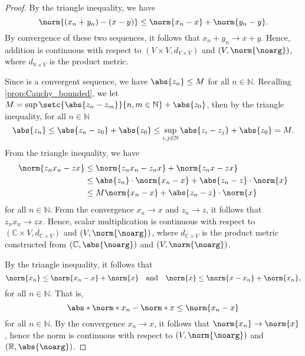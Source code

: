 \begin{proof}
    By the triangle inequality, we have
    \begin{equation*}
        \norm{(x_n + y_n) - (x - y)} \leq \norm{x_n - x} + \norm{y_n - y}.
    \end{equation*}
    By convergence of these two sequences, it follows that \(x_n + y_n \to x + y\). Hence, addition is continuous with respect to \((V \times V, d_{V\times V})\) and \((V, \norm{\noarg})\), where \(d_{\mathbb{V}\times V}\) is the product metric.

    Since  is a convergent sequence, we have \(\abs{z_n} \leq M\) for all \(n \in \mathbb{N}\). Recalling \cref{prop:Cauchy_bounded}, we let \(M = \sup\setc{\abs{z_n - z_m}}{n,m \in \mathbb{N}} + \abs{z_0}\), then by the triangle inequality, for all \(n \in \mathbb{N}\)
    \begin{equation*}
        \abs{z_n} \leq \abs{z_n - z_0} + \abs{z_0} \leq \sup_{i,j \in \mathbb{N}}{\abs{z_i - z_j}} + \abs{z_0} = M.
    \end{equation*}
    From the triangle inequality, we have
    \begin{align*}
        \norm{z_n x_n - zx} &\leq \norm{z_n x_n - z_n x} + \norm{z_n x - zx}\\
                            &\leq \abs{z_n}\cdot \norm{x_n - x} + \abs{z_n - z}\cdot \norm{x}\\
                            &\leq M \norm{x_n - x} + \abs{z_n - z}\cdot\norm{x}
    \end{align*}
    for all \(n \in \mathbb{N}\). From the convergence \(x_n \to x\) and \(z_n \to z\), it follows that \(z_n x_n \to zx\). Hence, scalar multiplication is continuous with respect to \((\mathbb{C} \times V, d_{\mathbb{C}\times V})\) and \((V, \norm{\noarg})\), where \(d_{\mathbb{C}\times V}\) is the product metric constructed from \((\mathbb{C}, \abs{\noarg})\) and \((V, \norm{\noarg})\).

    By the triangle inequality, it follows that
    \begin{equation*}
        \norm{x_n} \leq \norm{x_n - x} + \norm{x}\quad\text{and}\quad \norm{x} \leq \norm{x - x_n} + \norm{x_n},
    \end{equation*}
    for all \(n \in \mathbb{N}\). That is,
    \begin{equation*}
        \abs*{\norm*{x_n} - \norm*{x}} \leq \norm{x_n - x}
    \end{equation*}
    for all \(n \in \mathbb{N}\). By the convergence \(x_n \to x\), it follows that \(\norm{x_n} \to \norm{x}\), hence the norm is continuous with respect to \((V, \norm{\noarg})\) and \((\mathbb{R}, \abs{\noarg})\).
\end{proof}
